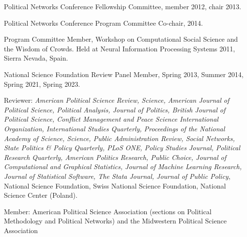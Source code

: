 \documentclass[overlapped,line]{res}
\begin{document}
\begin{resume}
\begin{etaremune}
\item Political Networks Conference Fellowship Committee, member 2012, chair 2013.
\item Political Networks Conference Program Committee Co-chair, 2014.
\item Program Committee Member, Workshop on Computational Social Science and the Wisdom of Crowds. Held at Neural Information Processing Systems 2011, Sierra Nevada, Spain.
\item National Science Foundation Review Panel Member, Spring 2013, Summer 2014, Spring 2021, Spring 2023.
\item Reviewer: {\em American Political Science Review, Science, American Journal of Political Science, Political Analysis, Journal of Politics, British Journal of Political Science, Conflict Management and Peace Science International Organization, International Studies Quarterly, Proceedings of the National Academy of Science,  Science,  Public Administration Review, Social Networks, State Politics \& Policy Quarterly, PLoS ONE, Policy Studies Journal, Political Research Quarterly, American Politics Research, Public Choice, Journal of Computational and Graphical Statistics, Journal of Machine Learning Research, Journal of Statistical Software, The Stata Journal, Journal of Public Policy}, National Science Foundation, Swiss National Science Foundation, National Science Center (Poland).
\item Member: American Political Science Association (sections on Political Methodology and Political Networks) and the Midwestern Political Science Association
\end{etaremune}











\end{resume}
\end{document}
